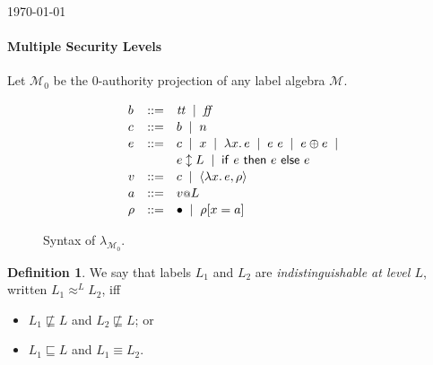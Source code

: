 \documentclass{article}
\makeatletter
\theoremstyle{definition}
\newtheorem{definition}{Definition}
\newcommand{\at}{\ensuremath{{\scriptstyle{@}}}}
\makeatother
\begin{document}
\begin{flushright}
  \today
\end{flushright}

\paragraph{Multiple Security Levels}
Let $\mathcal{M}_{0}$ be the 0-authority projection of any label algebra
$\mathcal{M}$.

\begin{figure}[ht]
  \centering
  \[
  \begin{array}[t]{lcl}
    b & ::= &
    \mathit{tt}\;\; |\;\;
    \mathit{ff}
    \\[0.3ex]
    c & :: = &
    b\;\; |\;\;
    n
    \\[0.3ex]
    e & ::= &
    c\;\; |\;\;
    x\;\; |\;\;
    \lambda{x}.\, e\;\; |\;\;
    e\ e\;\; |\;\;
    e \oplus e\;\; |
    \\[0.3ex] & &
    e \updownarrow L\;\; |\;\;
    \mathsf{if}\ e\ \mathsf{then}\ e\ \mathsf{else}\ e
    \\[0.3ex]
    v & ::= &
    c\;\; |\;\;
    \langle{\lambda{x}.\, e, \rho\rangle}
    \\[0.3ex]
    a & ::= &
    v \at L
    \\[0.3ex]
    \rho & ::= &
    \bullet\;\; |\;\;
    \rho[x = a]
  \end{array}
  \]
  \caption{Syntax of $\lambda_{\mathcal{M}_{0}}$.}
  \label{fig:syntax}
\end{figure}

\begin{definition}
  We say that labels $L_1$ and $L_2$ are \emph{indistinguishable at
    level $L$}, written $L_1 \approx^{L} L_2$, iff
  \begin{itemize}
  \item
    $L_1 \not\sqsubseteq L$ and
    $L_2 \not\sqsubseteq L$; or
  \item
    $L_1 \sqsubseteq L$ and
    $L_1 \equiv L_2$.
  \end{itemize}
  \label{def:lab-equiv}
\end{definition}
\end{document}
